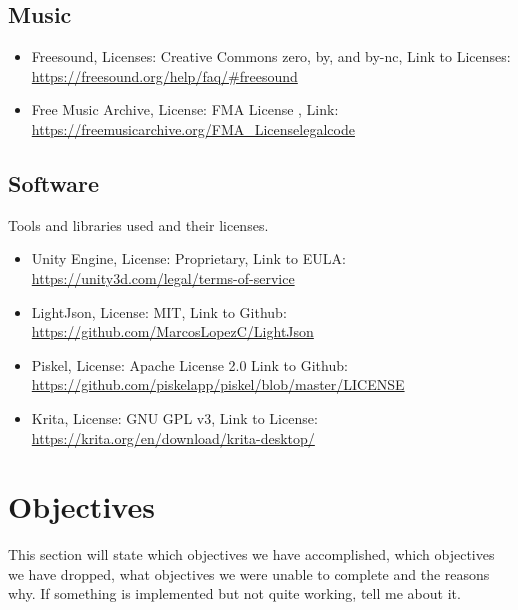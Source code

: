 \documentclass[a4paper]{article}
\begin{document}
\subsection{Music}
\begin{itemize}
\item Freesound, Licenses: Creative Commons zero, by, and by-nc, Link to Licenses: \url{https://freesound.org/help/faq/#freesound}
\item Free Music Archive, License: FMA License , Link: \url{https://freemusicarchive.org/FMA_Licenselegalcode}

\end{itemize}
\subsection{Software}
Tools and libraries used and their licenses.
\begin{itemize}
\item Unity Engine, License: Proprietary, Link to EULA: \url{https://unity3d.com/legal/terms-of-service}
\item LightJson, License: MIT, Link to Github: \url{https://github.com/MarcosLopezC/LightJson}
\item Piskel, License: Apache License 2.0 Link to Github: \url{https://github.com/piskelapp/piskel/blob/master/LICENSE}
\item Krita, License: GNU GPL v3, Link to License: \url{https://krita.org/en/download/krita-desktop/}
\end{itemize}

\section{Objectives}
This section will state which objectives we have accomplished, which objectives we have dropped, what objectives we were unable to complete and the reasons why. If something is implemented but not quite working, tell me about it.
\end{document}
